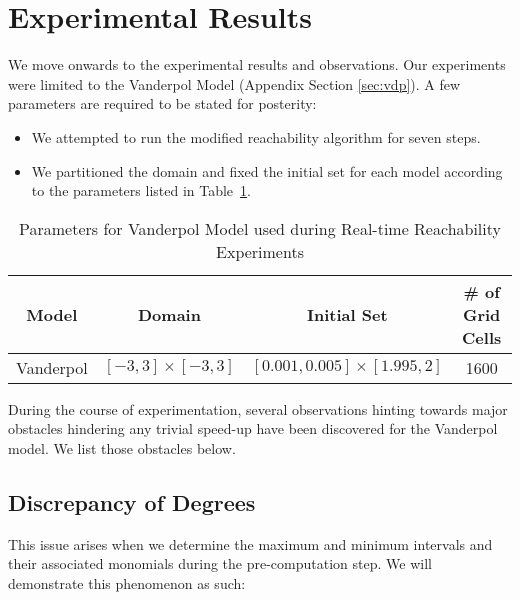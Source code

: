 \section{Experimental Results}
We move onwards to the experimental results and observations. Our experiments were limited to the Vanderpol Model (Appendix Section \ref{sec:vdp}). A few parameters are required to be stated for posterity:

\begin{itemize}
  \item  We attempted to run the modified reachability algorithm for seven steps.
  \item We partitioned the domain and fixed the initial set for each model according to the parameters listed in Table~\ref{tab:vdp_rt}.
\end{itemize}

\begin{table}
 \centering
 \begin{tabular}{|c|c|c|c|}
 \hline
 Model & Domain & Initial Set & \# of Grid Cells \\
 \hline
 Vanderpol & $[-3, 3] \times [-3, 3]$ & $[0.001, 0.005]\times [1.995, 2]$ & 1600 \\
 \hline
 \end{tabular}
 \caption{Parameters for Vanderpol Model used during Real-time Reachability Experiments}
 \label{tab:vdp_rt}
\end{table}

During the course of experimentation, several observations hinting towards major obstacles hindering any trivial speed-up have been discovered for the Vanderpol model. We list those obstacles below.

\subsection{Discrepancy of Degrees}
\label{sec:deg_disc}
This issue arises when we determine the maximum and minimum intervals and their associated monomials during the pre-computation step. We will demonstrate this phenomenon as such:

